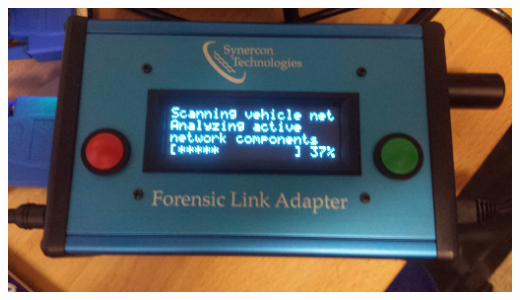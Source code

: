 \documentclass[11pt, oneside]{book}
\begin{document}
\begin{minipage}{0.45\textwidth}
\includegraphics[width=\linewidth]{../media/fla_screens/scan_1}
\end{minipage}
\\[\baselineskip]
\end{document}
